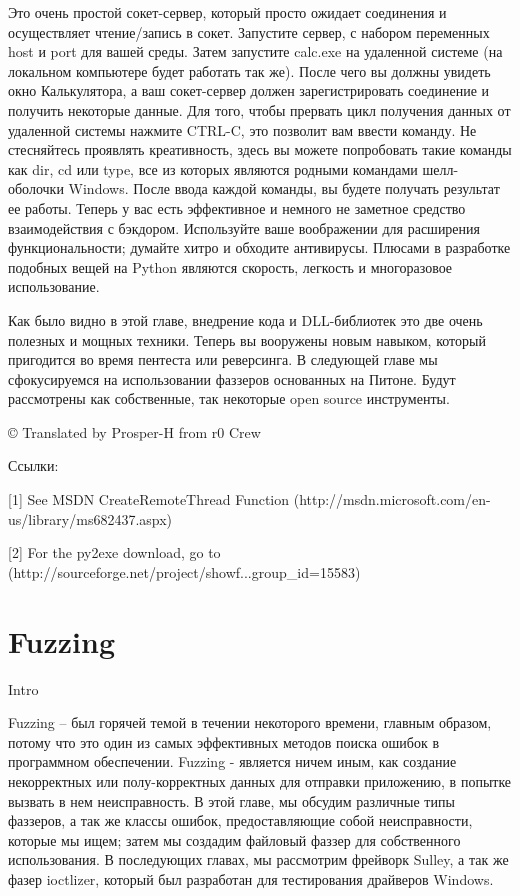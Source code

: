 \documentclass[12pt, a4paper, oneside]{book}
\begin{document}
Это очень простой сокет-сервер, который просто ожидает соединения и осуществляет чтение/запись в сокет. Запустите сервер, с набором переменных host и port для вашей среды. Затем запустите calc.exe на удаленной системе (на локальном компьютере будет работать так же). После чего вы должны увидеть окно Калькулятора, а ваш сокет-сервер должен зарегистрировать соединение и получить некоторые данные. Для того, чтобы прервать цикл получения данных от удаленной системы нажмите CTRL-C, это позволит вам ввести команду. Не стесняйтесь проявлять креативность, здесь вы можете попробовать такие команды как dir, cd или type, все из которых являются родными командами шелл-оболочки Windows. После ввода каждой команды, вы будете получать результат ее работы. Теперь у вас есть эффективное и немного не заметное средство взаимодействия с бэкдором. Используйте ваше воображении для расширения функциональности; думайте хитро и обходите антивирусы. Плюсами в разработке подобных вещей на Python являются скорость, легкость и многоразовое использование.

Как было видно в этой главе, внедрение кода и DLL-библиотек это две очень полезных и мощных техники. Теперь вы вооружены новым навыком, который пригодится во время пентеста или реверсинга. В следующей главе мы сфокусируемся на использовании фаззеров основанных на Питоне. Будут рассмотрены как собственные, так некоторые open source инструменты.


© Translated by Prosper-H from r0 Crew


Ссылки:

[1] See MSDN CreateRemoteThread Function (http://msdn.microsoft.com/en-us/library/ms682437.aspx)

[2] For the py2exe download, go to (http://sourceforge.net/project/showf...group\_id=15583)

\chapter{Fuzzing}
Intro

Fuzzing – был горячей темой в течении некоторого времени, главным образом, потому что это один из самых эффективных методов поиска ошибок в программном обеспечении. Fuzzing - является ничем иным, как создание некорректных или полу-корректных данных для отправки приложению, в попытке вызвать в нем неисправность. В этой главе, мы обсудим различные типы фаззеров, а так же классы ошибок, предоставляющие собой неисправности, которые мы ищем; затем мы создадим файловый фаззер для собственного использования. В последующих главах, мы рассмотрим фрейворк Sulley, а так же фазер ioctlizer, который был разработан для тестирования драйверов Windows.
\end{document}
